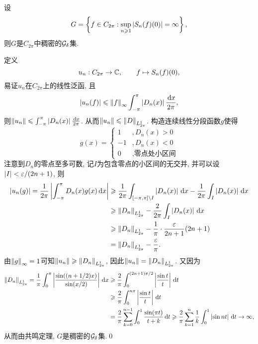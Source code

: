 \begin{Proposition}\label{prop:Dirichlet核反例}
	设
	\[
		G=\left\{ f\in C_{2\pi} : \sup_{n\geqslant 1}\left| S_n(f)(0) \right| =\infty \right\},
	\]
	则$ G $是$ C_{2\pi} $中稠密的$ \mathcal{G}_{\delta} $集.
\end{Proposition}
\begin{Proof}
	定义
	\[
		u_n : C_{2\pi}\to\mathbb{C},\qquad f\mapsto S_n(f)(0),
	\]
	易证$ u_n $在$ C_{2\pi} $上的线性泛函, 且
	\[
		\left| u_n(f) \right| \leqslant\left\| f \right\|_\infty\int_{-\pi}^\pi \left| D_n(x) \right| \frac{\,\mathrm{d} x}{2\pi},
	\]
	则$ \left\| u_n \right\|\leqslant\int_{-\pi}^\pi\left| D_n(x) \right| \frac{\,\mathrm{d} x}{2\pi} $. 从而$ \left\| u_n \right\|\leqslant\left\| D \right\|_{L_{2\pi}^1} $. 构造连续线性分段函数$ g $使得
	\[
		g(x)=\begin{cases}
			1 & ,D_n(x)>0 \\-1 & ,D_n(x)<0\\0 & ,\text{零点处小区间}
		\end{cases}
	\]
	注意到$ D_n $的零点至多可数, 记$ I $为包含零点的小区间的无交并, 并可以设$ \left| I \right| <\varepsilon/(2n+1) $, 则
	\[
		\begin{aligned}
			\left| u_n(g) \right| =\frac{1}{2\pi}\left| \int_{-\pi}^\pi D_n(x)g(x)\,\mathrm{d} x \right|  & \geqslant\frac{1}{2\pi}\int_{[-\pi,\pi]\setminus I}\left| D_n(x) \right| \,\mathrm{d} x-\frac{1}{2\pi}\int_I\left| D_n(x) \right| \,\mathrm{d} x \\
			                                                                   & \geqslant\left\| D_n \right\|_{L_{2\pi}^1}-\frac{2}{2\pi}\int_I\left| D_n(x) \right| \,\mathrm{d} x                                 \\
			                                                                   & \geqslant\left\| D_n \right\|_{L_{2\pi}^1}-\frac{1}{\pi}\cdot\frac{\varepsilon}{2n+1}(2n+1)                        \\
			                                                                   & =\left\| D_n \right\|_{L_{2\pi}^1}-\frac{\varepsilon}{\pi}.
		\end{aligned}
	\]
	由$ \left\| g \right\|_\infty=1 $可知$ \left\| u_n \right\|\geqslant \left\| D_n \right\|_{L_{2\pi}^1} $, 因此$ \left\| u_n \right\|=\left\| D_n \right\|_{L_{2\pi}^1} $. 又因为
	\[
		\begin{aligned}
			\left\| D_n \right\|_{L_{2\pi}^1}=\frac{1}{\pi}\int_0^\pi\left| \frac{\sin((n+1/2)x)}{\sin(x/2)} \right| \,\mathrm{d} x & \geqslant\frac{2}{\pi}\int_0^{(2n+1)\pi/2}\left| \frac{\sin t}{t} \right| \,\mathrm{d} t                                                                                  \\
			                                                                                             & \geqslant\frac{2}{\pi}\int_0^{n\pi}\left| \frac{\sin t}{t} \right| \,\mathrm{d} t                                                                                         \\
			                                                                                             & =\frac{2}{\pi}\sum_{k=0}^{n-1}\int_0^1\frac{\sin(\pi t)}{t+k}\,\mathrm{d} t\geqslant\frac{2}{\pi}\sum_{k=1}^n\frac{1}{k}\int_0^1\left| \sin nt \right| \,\mathrm{d} t\to \infty,
		\end{aligned}
	\]
	从而由共鸣定理, $ G $是稠密的$ \mathcal{G}_{\delta} $集.\qed
\end{Proof}

